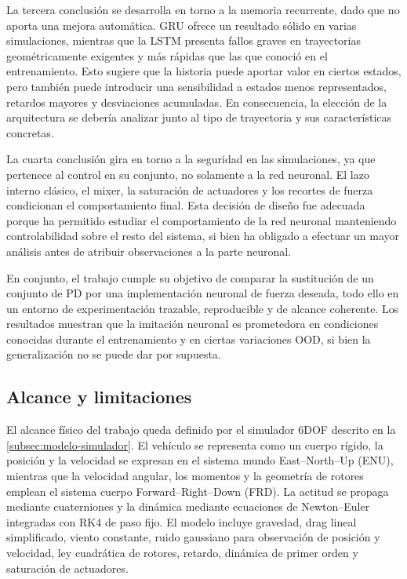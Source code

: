 La tercera conclusión se desarrolla en torno a la memoria recurrente, dado que no
aporta una mejora automática. GRU ofrece un resultado sólido en varias simulaciones,
mientras que la LSTM presenta fallos graves en trayectorias geométricamente exigentes y más
rápidas que las que conoció en el entrenamiento. Esto sugiere que la historia puede aportar
valor en ciertos estados, pero también puede introducir una sensibilidad a estados menos
representados, retardos mayores y desviaciones acumuladas. En consecuencia, la elección
de la arquitectura se debería analizar junto al tipo de trayectoria y sus características
concretas.

La cuarta conclusión gira en torno a la seguridad en las simulaciones, ya que pertenece al
control en su conjunto, no solamente a la red neuronal. El lazo interno clásico, el
mixer, la saturación de actuadores y los recortes de fuerza condicionan el
comportamiento final. Esta decisión de diseño fue adecuada porque ha permitido estudiar
el comportamiento de la red neuronal manteniendo controlabilidad sobre el resto del
sistema, si bien ha obligado a efectuar un mayor análisis antes de atribuir observaciones
a la parte neuronal.

En conjunto, el trabajo cumple su objetivo de comparar la sustitución de un conjunto de PD
por una implementación neuronal de fuerza deseada, todo ello en un entorno de experimentación
trazable, reproducible y de alcance coherente. Los resultados muestran que la imitación
neuronal es prometedora en condiciones conocidas durante el entrenamiento y en ciertas
variaciones OOD, si bien la generalización no se puede dar por supuesta. 

\subsection{Alcance y limitaciones}

El alcance físico del trabajo queda definido por el simulador 6DOF descrito en
la \autoref{subsec:modelo-simulador}. El vehículo se representa como un cuerpo rígido, la posición y la velocidad se expresan en el sistema mundo East--North--Up
(ENU), mientras que la velocidad angular, los momentos y la geometría de rotores
emplean el sistema cuerpo Forward--Right--Down (FRD). La actitud se propaga
mediante cuaterniones y la dinámica mediante ecuaciones de Newton--Euler
integradas con RK4 de paso fijo. El modelo incluye gravedad, drag lineal
simplificado, viento constante, ruido gaussiano para observación de posición
y velocidad, ley cuadrática de rotores, retardo, dinámica de primer orden y saturación de actuadores.

